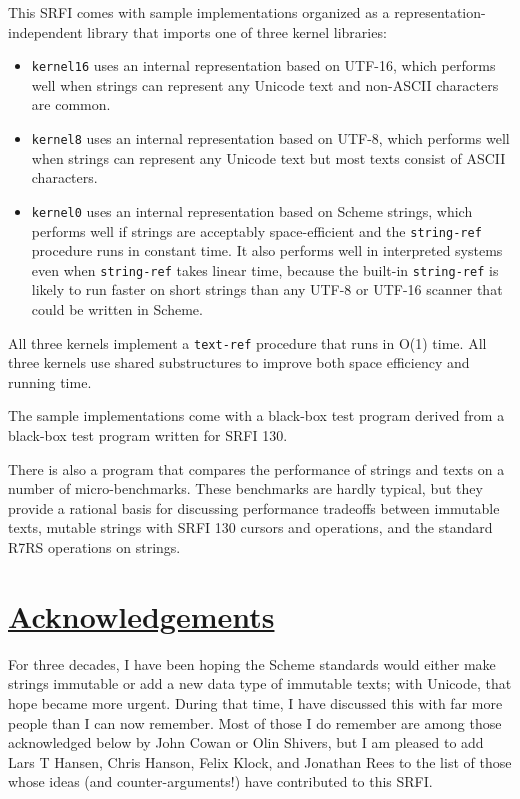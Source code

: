 This SRFI comes with sample implementations organized as a
representation-independent library that imports one of three kernel
libraries:

\begin{itemize}
\tightlist
\item
  \texttt{kernel16} uses an internal representation based on UTF-16,
  which performs well when strings can represent any Unicode text and
  non-ASCII characters are common.
\item
  \texttt{kernel8} uses an internal representation based on UTF-8, which
  performs well when strings can represent any Unicode text but most
  texts consist of ASCII characters.
\item
  \texttt{kernel0} uses an internal representation based on Scheme
  strings, which performs well if strings are acceptably space-efficient
  and the \texttt{string-ref} procedure runs in constant time. It also
  performs well in interpreted systems even when \texttt{string-ref}
  takes linear time, because the built-in \texttt{string-ref} is likely
  to run faster on short strings than any UTF-8 or UTF-16 scanner that
  could be written in Scheme.
\end{itemize}

All three kernels implement a \texttt{text-ref} procedure that runs in
O(1) time. All three kernels use shared substructures to improve both
space efficiency and running time.

The sample implementations come with a black-box test program derived
from a black-box test program written for SRFI 130.

There is also a program that compares the performance of strings and
texts on a number of micro-benchmarks. These benchmarks are hardly
typical, but they provide a rational basis for discussing performance
tradeoffs between immutable texts, mutable strings with SRFI 130 cursors
and operations, and the standard R7RS operations on strings.

\section{\texorpdfstring{\href{}{Acknowledgements}}{Acknowledgements}}\label{acknowledgements}

For three decades, I have been hoping the Scheme standards would either
make strings immutable or add a new data type of immutable texts; with
Unicode, that hope became more urgent. During that time, I have
discussed this with far more people than I can now remember. Most of
those I do remember are among those acknowledged below by John Cowan or
Olin Shivers, but I am pleased to add Lars T Hansen, Chris Hanson, Felix
Klock, and Jonathan Rees to the list of those whose ideas (and
counter-arguments!) have contributed to this SRFI.

